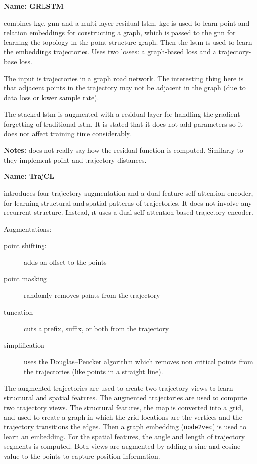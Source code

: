 \textbf{Name: GRLSTM}

\cite{zhou2023grlstm} combines \gls{kge}, \gls{gnn} and a multi-layer residual-\gls{lstm}.
%
\gls{kge} is used to learn point and relation embeddings for constructing a graph, which is passed to the \gls{gnn} for learning the topology in the point-structure graph. Then the \gls{lstm} is used to learn the embeddings trajectories.
%
Uses two losses: a graph-based loss and a trajectory-base loss.

The input is trajectories in a graph road network. The interesting thing here is that adjacent points in the trajectory may not be adjacent in the graph (due to data loss or lower sample rate).

The stacked \gls{lstm} is augmented with a residual layer for handling the gradient forgetting of traditional \gls{lstm}. It is stated that it does not add parameters so it does not affect training time considerably.

\textbf{Notes:} does not really say how the residual function is computed. Similarly to \cite{han2021graph} they implement point and trajectory distances. 


\textbf{Name: TrajCL}

\cite{chang2023contrastive} introduces four trajectory augmentation and a dual feature self-attention encoder, for learning structural and spatial patterns of trajectories. It does not involve any recurrent structure. Instead, it uses a dual self-attention-based trajectory encoder.

Augmentations:
\begin{description}
	\item[point shifting:] adds an offset to the points
	\item[point masking] randomly removes points from the trajectory
	\item[tuncation] cuts a prefix, suffix, or both from the trajectory
	\item[simplification] uses the Douglas–Peucker algorithm which removes non critical points from the trajectories (like points in a straight line).
\end{description}

The augmented trajectories are used to create two trajectory views to learn structural and spatial features. The augmented trajectories are used to compute two trajectory views.
%
The structural features, the map is converted into a grid, and used to create a graph in which the grid locations are the vertices and the trajectory transitions the edges. Then a graph embedding (\texttt{node2vec}) is used to learn an embedding.
%
For the spatial features, the angle and length of trajectory segments is computed.
%
Both views are augmented by adding a  sine and cosine value to the points to capture position information.

